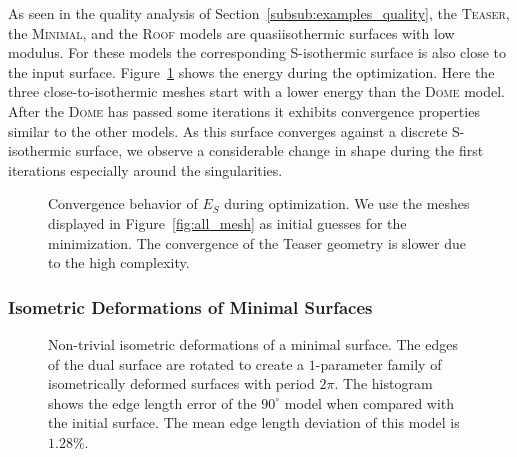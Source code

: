 \documentclass[Thesis.tex]{subfiles}
\begin{document}
As seen in the quality analysis of Section~\ref{subsub:examples_quality}, the
\textsc{Teaser}, the \textsc{Minimal}, and the \textsc{Roof} models are
quasiisothermic surfaces with low modulus. For these models the corresponding S-isothermic
surface is also close to the input surface. Figure~\ref{fig:convergence} shows
the energy during the optimization. Here the three close-to-isothermic meshes
start with a lower energy than the \textsc{Dome} model. After the \textsc{Dome}
has passed some iterations it exhibits convergence properties similar to the
other models. As this surface converges against a discrete S-isothermic surface,
we observe a considerable change in shape during the first iterations
especially around the singularities.

\begin{figure}
\centering
{}
\caption[Convergence behavior of $E_S$]{Convergence behavior of $E_S$ during optimization. We use the meshes 
displayed in Figure~\ref{fig:all_mesh} as initial guesses for the minimization. The
convergence of the Teaser geometry is slower due to the high complexity.}
\label{fig:convergence}
\end{figure}

\subsubsection{Isometric Deformations of Minimal Surfaces}
\label{sub:isometric}
\begin{figure}
\centering
\resizebox{\textwidth}{!}{}
\caption{Non-trivial isometric deformations of a minimal surface. The edges of the dual
surface are rotated to create a \mbox{$1$-parameter} family of isometrically
deformed surfaces with 
period $2\pi$. The histogram shows the edge length error of the $90^\circ$ model
when compared 
with the initial surface. The mean edge length deviation of this model is $1.28\%$.}
\label{fig:isometric} 
\end{figure}
\end{document}
